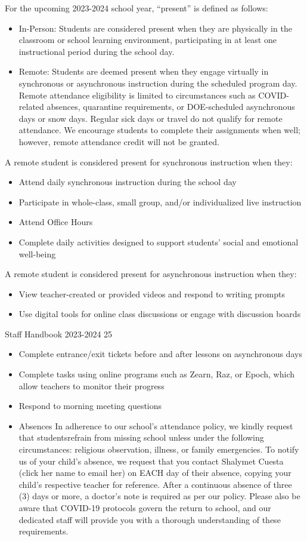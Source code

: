 \documentclass[letterpaper, 11pt]{article}
\begin{document}
For the upcoming 2023-2024 school year, ``present'' is defined as follows:
\begin{itemize}
\item In-Person: Students are considered present when they are physically in the classroom or school learning environment, participating in at least one instructional period during the school day.
\item Remote: Students are deemed present when they engage virtually in synchronous or asynchronous instruction during the scheduled program day. Remote attendance eligibility is limited to circumstances such as COVID-related absences, quarantine requirements, or DOE-scheduled asynchronous days or snow days. Regular sick days or travel do not qualify for remote attendance. We encourage students to complete their assignments when well; however, remote attendance credit will not be granted.
\end{itemize}

A remote student is considered present for synchronous instruction when they:
\begin{itemize}
\item Attend daily synchronous instruction during the school day
\item Participate in whole-class, small group, and/or individualized live instruction
\item Attend Office Hours
\item Complete daily activities designed to support students’ social and emotional well-being
\end{itemize}

A remote student is considered present for asynchronous instruction when they:
\begin{itemize}
\item View teacher-created or provided videos and respond to writing prompts
\item Use digital tools for online class discussions or engage with discussion boards
\end{itemize}

Staff Handbook 2023-2024 25
\begin{itemize}
\item Complete entrance/exit tickets before and after lessons on asynchronous days
\item Complete tasks using online programs such as Zearn, Raz, or Epoch, which allow teachers to monitor their progress
\item Respond to morning meeting questions
\item Absences In adherence to our school’s attendance policy, we kindly request that studentsrefrain from missing school unless under the following circumstances: religious observation, illness, or family emergencies. To notify us of your child’s absence, we request that you contact Shalymet Cuesta (click her name to email her) on EACH day of their absence, copying your child’s respective teacher for reference. After a continuous absence of three (3) days or more, a doctor’s note is required as per our policy. Please also be aware that COVID-19 protocols govern the return to school, and our dedicated staff will provide you with a thorough understanding of these requirements.
\end{itemize}
\end{document}

